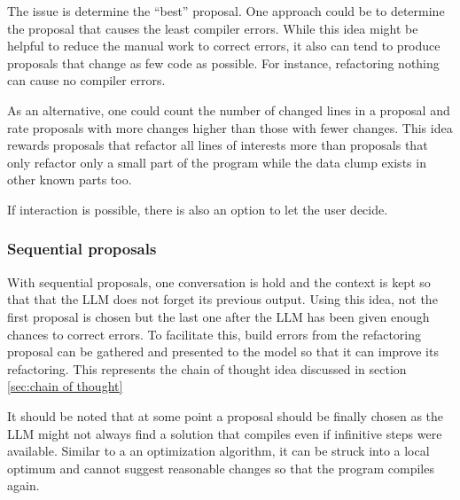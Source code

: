 The issue is determine the \enquote{best} proposal. One approach could be to determine the proposal that causes the least compiler errors. While this idea might be helpful to reduce the manual work to correct errors, it also can tend to produce proposals that change as few code as possible. For instance, refactoring nothing can cause no compiler errors.

As an alternative, one could count the number of changed lines in a proposal and rate proposals with more changes higher than those with fewer changes. This idea rewards proposals that refactor all lines of interests more than proposals that only refactor only a small part of the program while the data clump exists in other known parts too. 


If interaction is possible, there is also an option to let the user decide.
\subsubsection{Sequential proposals}

With sequential proposals, one conversation is hold and the context is kept so that that the \ac{LLM} does not forget its previous output. Using this idea, not the first proposal is chosen but the last one after the \ac{LLM} has been given enough chances to correct errors.  To facilitate this, build errors from the refactoring proposal can be gathered and presented to the model so that it can improve its refactoring. This represents the chain of thought idea discussed in section \ref{sec:chain of thought}

It should be noted that at some point a proposal should be finally chosen as the \ac{LLM} might not always find a solution that compiles even if infinitive steps were available. Similar to a an optimization algorithm, it can be struck into a local optimum and cannot suggest reasonable changes so that the program compiles again.  